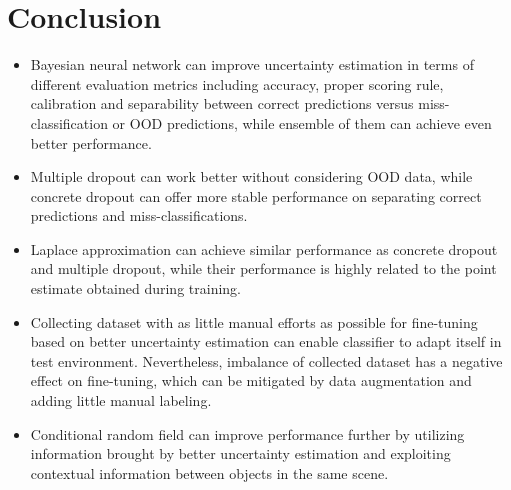 \section{Conclusion}
\begin{itemize}
	\item Bayesian neural network can improve uncertainty estimation in terms of different evaluation metrics including accuracy, proper scoring rule, calibration and separability between correct predictions versus miss-classification or OOD predictions, while ensemble of them can achieve even better performance.
	
	\item Multiple dropout can work better without considering OOD data, while concrete dropout can offer more stable performance on separating correct predictions and miss-classifications.
	
	\item Laplace approximation can achieve similar performance as concrete dropout and multiple dropout, while their performance is highly related to the point estimate obtained during training.
	
	\item Collecting dataset with as little manual efforts as possible for fine-tuning based on better uncertainty estimation can enable classifier to adapt itself in test environment. Nevertheless, imbalance of collected dataset has a negative effect on fine-tuning, which can be mitigated by data augmentation and adding little manual labeling.
	
	\item Conditional random field can improve performance further by utilizing information brought by better uncertainty estimation and exploiting contextual information between objects in the same scene.
	
\end{itemize}


